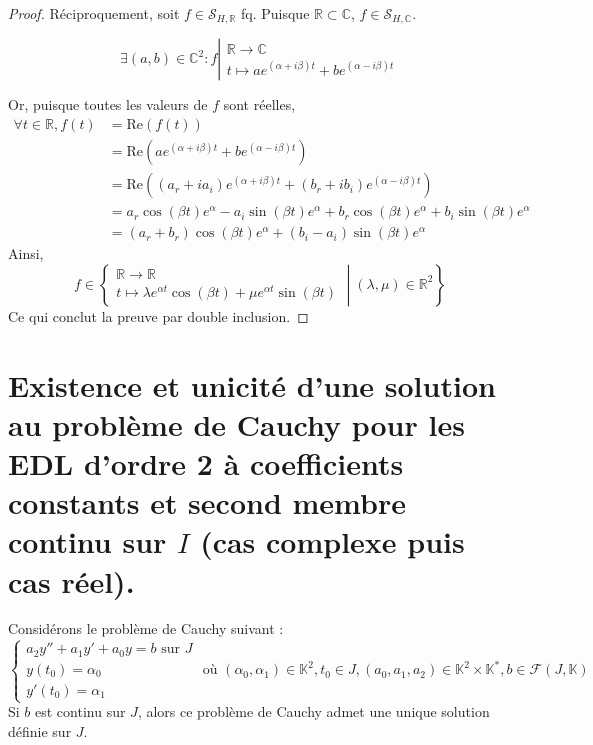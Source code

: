 \documentclass{article}
\newcommand{\Sol}{\mathcal S}
\renewcommand{\Re}{\text{Re}}
\newcommand{\C}{\mathbb C}
\newcommand{\R}{\mathbb R}
\begin{document}
\begin{proof}
	Réciproquement, soit $ f \in \Sol_{H ,\R}$ fq. Puisque $\R \subset \C$,  $ f \in \Sol_{H ,\C}$.
	
	$$
	\exists (a, b) \in \C^2 : f \left| \begin{array}{l}
    \R \to \C  \\
    t \mapsto a e^{(\alpha + i \beta) t}  + b e^{(\alpha - i \beta)t}
	\end{array}\right.$$

	Or, puisque toutes les valeurs de $f$ sont réelles,
	\begin{align*}
		\forall t \in \R, f(t) &= \Re(f(t)) \\
				&= \Re(a e^{(\alpha + i \beta) t}  + b e^{(\alpha - i \beta)t})\\
				&= \Re((a_r + i a_i) e^{(\alpha + i \beta) t}  + (b_r + i b_i) e^{(\alpha - i \beta)t})\\
			    &= a_r \cos(\beta t)e^\alpha - a_i\sin(\beta t)e^\alpha + b_r \cos(\beta t)e^\alpha + b_i \sin(\beta t) e^\alpha \\
			    &= (a_r + b_r) \cos(\beta t) e^\alpha + (b_i - a_i) \sin(\beta t) e^\alpha
	\end{align*}
	Ainsi,
	$$f\in \left\{ 
	\begin{array}{l}
    \R \to \R  \\
    t \mapsto \lambda e^{\alpha t } \cos (\beta t)   + \mu e^{\alpha t } \sin (\beta t)
  \end{array}
	\middle\vert  (\lambda, \mu) \in \R ^2 \right\}
$$
Ce qui conclut la preuve par double inclusion.
\end{proof}

\section{Existence et unicité d'une solution au problème de Cauchy pour les EDL d'ordre 2 à coefficients constants et second membre continu sur $I$ (cas complexe puis cas réel).}

Considérons le problème de Cauchy suivant :
$$\left\{ \begin{array}{l}
    a_{2}y''+a_{1}y'+a_{0}y = b \text{ sur } J  \\
    y(t_{0}) = \alpha_{0} \\
    y'(t_{0}) = \alpha_{1}
\end{array} \right. \text{ où } (\alpha_{0}, \alpha_{1}) \in \mathbb{K}^{2}, t_{0} \in J, (a_{0}, a_{1}, a_{2}) \in \mathbb{K}^{2} \times \mathbb{K}^{*}, b \in \mathcal{F}(J, \mathbb{K})$$
Si $b$ est continu sur $J$, alors ce problème de Cauchy admet une unique solution définie sur $J$.
\newline\newline
\end{document}
